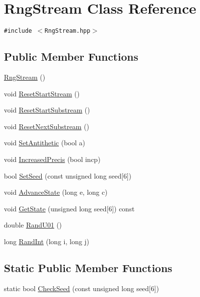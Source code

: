 \hypertarget{classRngStream}{
\section{RngStream Class Reference}
\label{classRngStream}
}
{\tt \#include $<$RngStream.hpp$>$}

\subsection*{Public Member Functions}
\begin{CompactItemize}
\item 
\hyperlink{classRngStream_c44014ddf4c23196a1a846067b0e7399}{RngStream} ()
\item 
void \hyperlink{classRngStream_9b32b5d96cb85b42790c5eae2f452375}{ResetStartStream} ()
\item 
void \hyperlink{classRngStream_b2ffe916a1c584726a7c26ea1defe103}{ResetStartSubstream} ()
\item 
void \hyperlink{classRngStream_da321a36888d4159d84d72247a11ed2e}{ResetNextSubstream} ()
\item 
void \hyperlink{classRngStream_72bf0888332be543e618d63d8909b3a8}{SetAntithetic} (bool a)
\item 
void \hyperlink{classRngStream_47bdd7a00652f604510c71acf4158467}{IncreasedPrecis} (bool incp)
\item 
bool \hyperlink{classRngStream_53e007f5ffda8a9cbc05f5facdfd1993}{SetSeed} (const unsigned long seed\mbox{[}6\mbox{]})
\item 
void \hyperlink{classRngStream_33e7544ccab8902fe6e9014a301f4ae3}{AdvanceState} (long e, long c)
\item 
void \hyperlink{classRngStream_2549af41becd68ac560a26614878aac8}{GetState} (unsigned long seed\mbox{[}6\mbox{]}) const 
\item 
double \hyperlink{classRngStream_0c65488978d5f889a5ce202ad062f4cf}{RandU01} ()
\item 
long \hyperlink{classRngStream_81b1022e20b49d2c40e6090a09af833b}{RandInt} (long i, long j)
\end{CompactItemize}
\subsection*{Static Public Member Functions}
\begin{CompactItemize}
\item 
static bool \hyperlink{classRngStream_e68a1093e1b53b5d461e44535f3c3170}{CheckSeed} (const unsigned long seed\mbox{[}6\mbox{]})
\end{CompactItemize}


